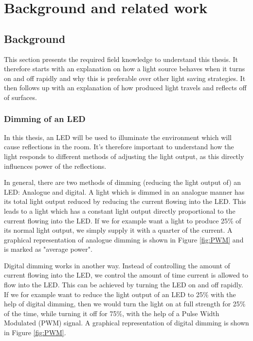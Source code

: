 \chapter{Background and related work}

\section{Background}
\label{sec:Background}
This section presents the required field knowledge to understand this thesis. It therefore starts with an explanation on how a light source behaves when it turns on and off rapidly and why this is preferable over other light saving strategies. It then follows up with an explanation of how produced light travels and reflects off of surfaces.

\subsection{Dimming of an LED}
In this thesis, an LED will be used to illuminate the environment which will cause reflections in the room. It's therefore important to understand how the light responds to different methods of adjusting the light output, as this directly influences power of the reflections.

In general, there are two methods of dimming (reducing the light output of) an LED: Analogue and digital. A light which is dimmed in an analogue manner has its total light output reduced by reducing the current flowing into the LED. This leads to a light which has a constant light output directly proportional to the current flowing into the LED. If we for example want a light to produce 25\% of its normal light output, we simply supply it with a quarter of the current. A graphical representation of analogue dimming is shown in Figure \ref{fig:PWM} and is marked as "average power".

Digital dimming works in another way. Instead of controlling the amount of current flowing into the LED, we control the amount of time current is allowed to flow into the LED. This can be achieved by turning the LED on and off rapidly. If we for example want to reduce the light output of an LED to 25\% with the help of digital dimming, then we would turn the light on at full strength for 25\% of the time, while turning it off for 75\%, with the help of a Pulse Width Modulated (PWM) signal. A graphical representation of digital dimming is shown in Figure \ref{fig:PWM}.

